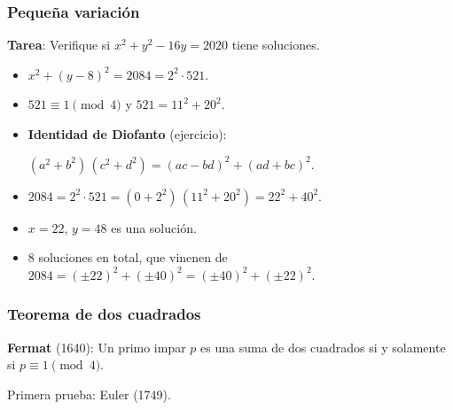 \documentclass[handout]{beamer}
\begin{document}
\begin{frame}[fragile]
  \frametitle{Pequeña variación}

  \begin{shaded}
    \textbf{Tarea}: Verifique si $x^2 + y^2 - 16y = 2020$ tiene soluciones.
  \end{shaded}

  \vspace{1em}

  \ifdefined\solutions

  \begin{itemize}
  \item<3-> $x^2 + (y - 8)^2 = 2084 = 2^2 \cdot 521$.
 
  \item<4-> $521 \equiv 1 \pmod{4}$ y $521 = 11^2 + 20^2$.

  \item<5-> \textbf{Identidad de Diofanto} (ejercicio):

    $(a^2 + b^2)\,(c^2 + d^2) = (ac - bd)^2 + (ad + bc)^2$.

  \item<6-> $2084 = 2^2\cdot 521 = (0 + 2^2)\,(11^2 + 20^2) = 22^2 + 40^2$.

  \item<7-> $x = 22$, $y = 48$ es una solución.

  \item<8-> $8$ soluciones en total, que vinenen de $2084 = (\pm 22)^2 + (\pm 40)^2 = (\pm 40)^2 + (\pm 22)^2$.
\end{itemize}
\fi
\end{frame}


\begin{frame}[fragile]
  \frametitle{Teorema de dos cuadrados}

  \begin{shaded}
    \textbf{Fermat} (1640): Un primo impar $p$ es una suma de dos cuadrados si y
    solamente si $p \equiv 1 \pmod{4}$.

    Primera prueba: Euler (1749).
  \end{shaded}

\end{frame}
\end{document}
